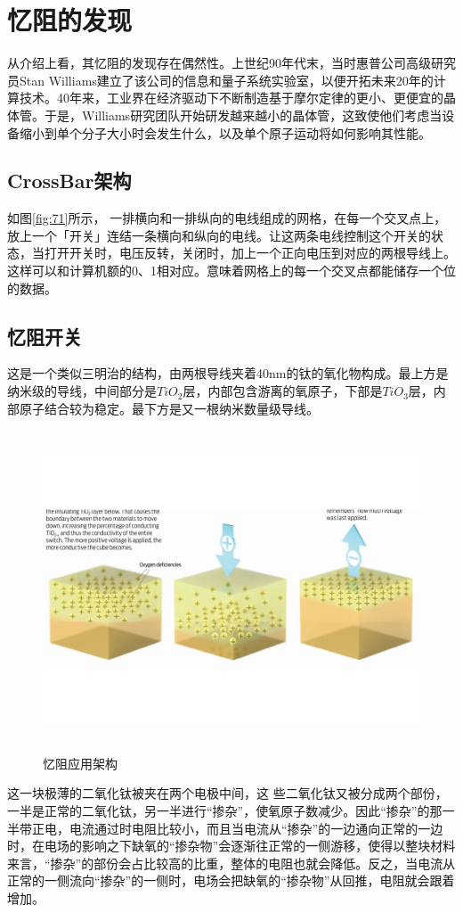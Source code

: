 \documentclass[UTF8]{article}
\begin{document}
\section{忆阻的发现}
从介绍上看，其忆阻的发现存在偶然性。上世纪90年代末，当时惠普公司高级研究员Stan Williams建立了该公司的信息和量子系统实验室，以便开拓未来20年的计算技术。40年来，工业界在经济驱动下不断制造基于摩尔定律的更小、更便宜的晶体管\cite{moore2}。于是，Williams研究团队开始研发越来越小的晶体管，这致使他们考虑当设备缩小到单个分子大小时会发生什么，以及单个原子运动将如何影响其性能。


\subsection{CrossBar架构}
如图\eqref{fig:71}所示，
一排横向和一排纵向的电线组成的网格，在每一个交叉点上，放上一个「开关」连结一条横向和纵向的电线。让这两条电线控制这个开关的状态，当打开开关时，电压反转，关闭时，加上一个正向电压到对应的两根导线上。这样可以和计算机额的0、1相对应。意味着网格上的每一个交叉点都能储存一个位的数据。


\subsection{忆阻开关}
这是一个类似三明治的结构，由两根导线夹着40nm的钛的氧化物构成。最上方是纳米级的导线，中间部分是$TiO_{2}$层，内部包含游离的氧原子，下部是$TiO_{3}$层，内部原子结合较为稳定。最下方是又一根纳米数量级导线\cite{mem4}。
\begin{figure}[htbp]
\centering
\includegraphics[width=5.77in,height=3.75in]{pic/8}
\caption{忆阻应用架构}
\label{fig:8}
\end{figure}
这一块极薄的二氧化钛被夹在两个电极中间，这
些二氧化钛又被分成两个部份，一半是正常的二氧化钛，另一半进行“掺杂”，使氧原子数减少。因此“掺杂”的那一半带正电，电流通过时电阻比较小，而且当电流从“掺杂”的一边通向正常的一边时，在电场的影响之下缺氧的“掺杂物”会逐渐往正常的一侧游移，使得以整块材料来言，“掺杂”的部份会占比较高的比重，整体的电阻也就会降低。反之，当电流从正常的一侧流向“掺杂”的一侧时，电场会把缺氧的“掺杂物”从回推，电阻就会跟着增加\cite{mem4}。
\end{document}
